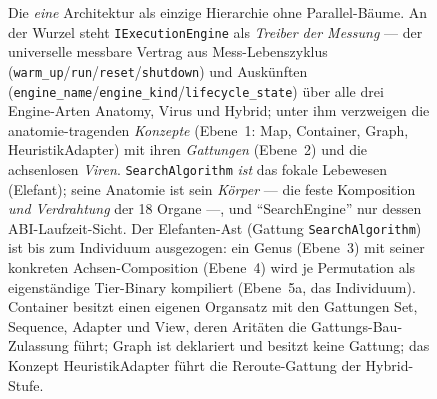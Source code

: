 \begin{figure}[!htbp]
  \caption{Die \emph{eine} Architektur als einzige Hierarchie ohne Parallel-Bäume. An der Wurzel steht
  \texttt{IExecutionEngine} als \emph{Treiber der Messung} --- der universelle messbare Vertrag aus
  Mess-Lebenszyklus (\texttt{warm\_up}/\texttt{run}/\texttt{reset}/\texttt{shutdown}) und Auskünften
  (\texttt{engine\_name}/\texttt{engine\_kind}/\texttt{lifecycle\_state}) über alle drei Engine-Arten
  Anatomy, Virus und Hybrid; unter ihm verzweigen die anatomie-tragenden \emph{Konzepte} (Ebene~1: Map,
  Container, Graph, HeuristikAdapter) mit ihren \emph{Gattungen} (Ebene~2) und die achsenlosen \emph{Viren}.
  \texttt{SearchAlgorithm} \emph{ist} das fokale Lebewesen (Elefant); seine Anatomie ist sein
  \emph{Körper} --- die feste Komposition \emph{und Verdrahtung} der 18 Organe ---, und
  \enquote{SearchEngine} nur dessen ABI-Laufzeit-Sicht. Der Elefanten-Ast (Gattung \texttt{SearchAlgorithm}) ist bis zum Individuum
  ausgezogen: ein Genus (Ebene~3) mit seiner konkreten Achsen-Composition (Ebene~4) wird je Permutation
  als eigenständige Tier-Binary kompiliert (Ebene~5a, das Individuum). Container besitzt einen eigenen Organsatz mit den Gattungen Set, Sequence, Adapter und
  View, deren Aritäten die Gattungs-Bau-Zulassung führt; Graph ist deklariert und besitzt keine Gattung; das
  Konzept HeuristikAdapter führt die Reroute-Gattung der Hybrid-Stufe.}\label{fig:one-architecture}
\end{figure}

